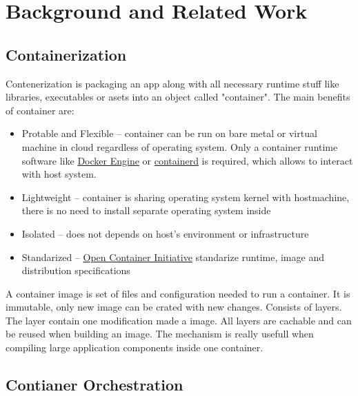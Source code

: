 \chapter{Background and Related Work}
\label{cha:background}



\section{Containerization}
\label{sec:containerization}

Contenerization is packaging an app along with all necessary runtime stuff like libraries, executables or asets into an object called "container". The main benefits of container are\cite{RedhatContainerization}:
\begin{itemize}
    \item Protable and Flexible -- container can be run on bare metal or virtual machine in cloud regardless of operating system. Only a container runtime software like \href{https://docs.docker.com/engine/}{Docker Engine} or \href{https://containerd.io/}{containerd} is required, which allows to interact with host system.
    \item Lightweight -- container is sharing operating system kernel with hostmachine, there is no need to install separate operating system inside
    \item Isolated -- does not depends on host's environment or infrastructure
    \item Standarized -- \href{https://opencontainers.org/}{Open Container Initiative} standarize runtime, image and distribution specifications
\end{itemize}
A container image is set of files and configuration needed to run a container. It is immutable, only new image can be crated with new changes. Consists of layers. The layer contain one modification made a image. All layers are cachable and can be reused when building an image. The mechanism is really usefull when compiling large application components inside one container\cite{DockerImage}.


\section{Contianer Orchestration}
\label{sec:ContianerOrchestration}

